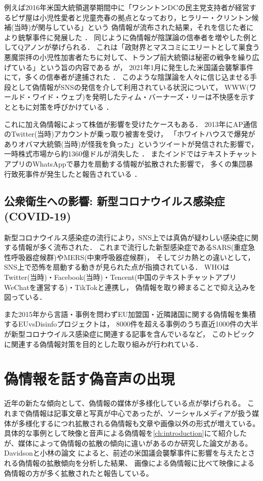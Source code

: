 例えば2016年米国大統領選挙期間中に「ワシントンDCの民主党支持者が経営するピザ屋は小児性愛者と児童売春の拠点となっており，ヒラリー・クリントン候補(当時)が関与している」という
偽情報が流布された結果，それを信じた者により銃撃事件に発展した \cite{agencies_2016}．
同じように偽情報が陰謀論の信奉者を増やした例としてQアノンが挙げられる．
これは「政財界とマスコミにエリートとして巣食う悪魔崇拝の小児性加害者たちに対して、トランプ前大統領は秘密の戦争を繰り広げている」という旨の内容である \cite{wendling_2021}が，
2021年1月に発生した米国議会襲撃事件にて，多くの信奉者が逮捕された \cite{hymes_mcdonald_watson_2021}．
このような陰謀論を人々に信じ込ませる手段として偽情報がSNSの発信を介して利用されている状況について，
WWW(ワールド・ワイド・ウェブ)を発明したティム・バーナーズ・リーは不快感を示すとともに対策を呼びかけている \cite{reklaitis_2018}．

これに加え偽情報によって株価が影響を受けたケースもある．
2013年にAP通信のTwitter(当時)アカウントが乗っ取り被害を受け，
「ホワイトハウスで爆発がありオバマ大統領(当時)が怪我を負った」というツイートが発信された影響で，
一時株式市場から約1360億ドルが消失した \cite{fisher_2013}．
またインドではテキストチャットアプリのWhatsAppで暴力を扇動する情報が拡散された影響で，
多くの集団暴行致死事件が発生したと報告されている \cite{frayer_2018}．

\subsection{公衆衛生への影響: 新型コロナウイルス感染症(COVID-19)}
新型コロナウイルス感染症の流行により，SNS上では真偽が疑わしい感染症に関する情報が多く流布された．
これまで流行した新型感染症であるSARS(重症急性呼吸器症候群)やMERS(中東呼吸器症候群)，
そしてジカ熱との違いとして，SNS上で恐怖を扇動する動きが見られた点が指摘されている．
WHOはTwitter(当時)・Facebook(当時)・Tencent(中国のテキストチャットアプリWeChatを運営する)・TikTokと連携し，
偽情報を取り締まることで抑え込みを図っている\cite{hao_2020}．

また2015年から言語・事例を問わずEU加盟国・近隣諸国に関する偽情報を集積するEUvsDisinfoプロジェクト\cite{euvsdisinfo_2020}は，
8000件を超える事例のうち直近1000件の大半が新型コロナウイルス感染症に関連する記事を含んでいる\cite{euvsdisinfo_2020_2}など，
このトピックに関連する偽情報対策を目的とした取り組みが行われている．

\section{偽情報を話す偽音声の出現}
近年の新たな傾向として、偽情報の媒体が多様化している点が挙げられる。
これまで偽情報は記事文章と写真が中心であったが、ソーシャルメディアが扱う媒体が多様化するにつれ拡散される偽情報も文章や画像以外の形式が増えている。
具体的な事例として映像と音声による偽情報を\cref{ch:introduction}にて紹介したが、媒体によって偽情報の拡散の傾向に違いがあるのか研究した論文がある。
Davidsonと小林の論文 \cite{DAVIDSON2022107241}によると、前述の米国議会襲撃事件に影響を与えたとされる偽情報の拡散傾向を分析した結果、
画像による偽情報に比べて映像による偽情報の方が多く拡散されたと報告している。

